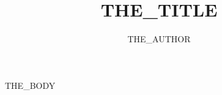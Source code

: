 \documentclass[]{article}
\title{THE_TITLE}
\author{THE_AUTHOR}
\begin{document}
\maketitle
\tableofcontents
\newpage

THE_BODY
\end{document}
